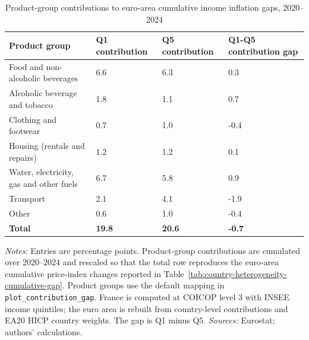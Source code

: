 \begin{table}[H]
\small
\setlength{\tabcolsep}{4.2pt}
\renewcommand{\arraystretch}{0.95}

\caption{\label{tab:ea20-income-gap-product-contributions}Product-group contributions to euro-area cumulative income inflation gaps, 2020--2024}
\centering
\begin{tabular}[t]{llll}
\toprule
Product group & Q1 contribution & Q5 contribution & Q1-Q5 contribution gap\\
\midrule
Food and non-alcoholic beverages & 6.6 & 6.3 & 0.3\\
Alcoholic beverage and tobacco & 1.8 & 1.1 & 0.7\\
Clothing and footwear & 0.7 & 1.0 & -0.4\\
Housing (rentals and repairs) & 1.2 & 1.2 & 0.1\\
Water, electricity, gas and other fuels & 6.7 & 5.8 & 0.9\\
\addlinespace
Transport & 2.1 & 4.1 & -1.9\\
Other & 0.6 & 1.0 & -0.4\\
\midrule
\textbf{Total} & \textbf{19.8} & \textbf{20.6} & \textbf{-0.7}\\
\bottomrule
\end{tabular}
\vspace{-0.4em}
\begin{flushleft}
\footnotesize{\emph{Notes:} Entries are percentage points. Product-group contributions are cumulated over 2020--2024 and rescaled so that the total row reproduces the euro-area cumulative price-index changes reported in Table~\ref{tab:country-heterogeneity-cumulative-gap}. Product groups use the default mapping in \texttt{plot\_contribution\_gap}. France is computed at COICOP level 3 with INSEE income quintiles; the euro area is rebuilt from country-level contributions and EA20 HICP country weights. The gap is Q1 minus Q5. \emph{Sources:} Eurostat; authors' calculations.}
\end{flushleft}
\end{table}
